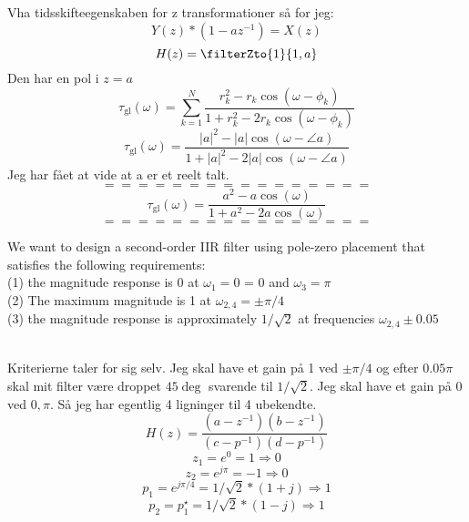 \begin{Opgaver}
\begin{kapitel}
\begin{Opgave}
            \begin{UnderOpgave}[\text{$y[n]=\alpha y[n-1]+x[n]$}]
                Vha tidsskifteegenskaben for z transformationer så for jeg:
                \[Y(z) * (1 - az^{-1}) = X(z)\]
                \[H(z) = \filterZto{1}{1, a}\]
                Den har en pol i $z = a$
                \[\tau_{\mathrm{gl}}(\omega) =\sum_{k=1}^{N}{\frac{r_{k}^{2}-r_{k}\cos(\omega-\phi_{k})}{1+r_{k}^{2}-2r_{k}\cos(\omega-\phi_{k})}}\]
                \[\tau_{\mathrm{gl}}(\omega) = {\frac{|a|^{2}-|a|\cos(\omega-\angle a)}{1+|a|^{2}-2 |a|\cos(\omega-\angle a)}}\]
                Jeg har fået at vide at a er et reelt talt.
                \[================\]
                \[\tau_{\mathrm{gl}}(\omega) = {\frac{a^{2}-a\cos(\omega)}{1+a^{2}-2 a\cos(\omega)}}\]
                \[================\]

                
            \end{UnderOpgave}

            \begin{UnderOpgave}[\text{$y[n]=2\alpha\cos\phi y[n-1]-\alpha^{2}y[n-2]+x[n]$}]
                
            \end{UnderOpgave}          
        \end{Opgave}
        \begin{Opgave}
            We want to design a second-order IIR filter using pole-zero placement that satisfies the following requirements: \\
            (1) the magnitude response is 0 at $\omega_1 = 0$ = 0 and $\omega_3 = \pi$ \\
            (2) The maximum magnitude is 1 at $\omega_{2,4} = \pm \pi/4$\\
            (3) the magnitude response is approximately $1/\sqrt{2}$ at frequencies $\omega_{2,4} \pm 0.05$\\\\
            \begin{UnderOpgave}   
                Kriterierne taler for sig selv. 
                Jeg skal have et gain på 1 ved $\pm \pi/4$ og efter $0.05\pi$ skal mit filter være droppet $45\deg$ svarende til $1/\sqrt{2}$. 
                Jeg skal have et gain på 0 ved $0, \pi$. Så jeg har egentlig 4 ligninger til 4 ubekendte.
                \[H(z) = \frac{(a - z^{-1})(b - z^{-1})}{(c - p^{-1})(d - p^{-1})}\]
                \[z_1 = e^{0}       = 1                    \Rightarrow 0\]
                \[z_2 = e^{j \pi}   = - 1                  \Rightarrow 0\]
                \[p_1 = e^{j\pi/4}  = 1/\sqrt{2} * (1 + j) \Rightarrow 1\]
                \[p_2 = p_1^\star   = 1/\sqrt{2} * (1 - j) \Rightarrow 1\]


\end{UnderOpgave}
\end{Opgave}
\end{kapitel}
\end{Opgaver}
